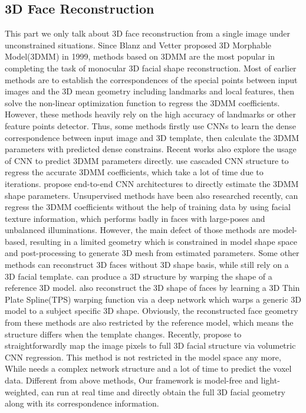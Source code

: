 \documentclass[runningheads]{llncs}
\begin{document}
\subsection{3D Face Reconstruction}
This part we only talk about 3D face reconstruction from a single image under unconstrained situations. 
Since Blanz and Vetter proposed 3D Morphable Model(3DMM) in 1999\cite{blanz1999a}, 
methods based on 3DMM are the most popular in completing the task of monocular 3D facial shape reconstruction.
Most of earlier methods are to establish the correspondences of the special points between input images and the 3D mean geometry including landmarks\cite{Lee2012Single,zhu2015high-fidelity,Thies2016Face2Face,Huber2016A,Cao2014Displaced,jeni2015dense,grewe2016fully} and local features\cite{Huber2015Fitting,Romdhani2005Estimating,grewe2016fully}, then solve the non-linear optimization function to regress the 3DMM coefficients. 
However, these methods heavily rely on the high accuracy of landmarks or other feature points detector.
Thus, some methods\cite{guler2017densereg,Yu2017Learning} firstly use CNNs to learn the dense correspondence between input image and 3D template, then calculate the 3DMM parameters with predicted dense constrains.
Recent works also explore the usage of CNN to predict 3DMM parameters directly. 
\cite{Jourabloo2016Large,zhu2016face,Richardson20163D,liu2016joint,Richardson2016Learning} use cascaded CNN structure to regress the accurate 3DMM coefficients, which take a lot of time due to iterations.
\cite{Dou2017End,Tran2016Regressing,jourabloo2015pose,laine2016facial} propose end-to-end CNN architectures to directly estimate the 3DMM shape parameters.
Unsupervised methods have been also researched recently, \cite{Tewari2017MoFA,Bas20173D} can regress the 3DMM coefficients without the help of training data by using facial texture information, which performs badly in faces with large-poses and unbalanced illuminations.
However, the main defect of those methods are model-based, resulting in a limited geometry which is constrained in model shape space and post-processing to generate 3D mesh from estimated parameters.
Some other methods can reconstruct 3D faces without 3D shape basis, while still rely on a 3D facial template.
\cite{Hassner2013Viewing,Kemelmacher20113D,gu20063d,Sela2017Unrestricted,santa20163d} can produce a 3D structure by warping the shape of a reference 3D model.
\cite{bhagavatula2017faster} also reconstruct the 3D shape of faces by learning a 3D Thin Plate Spline(TPS) warping function via a deep network which warps a generic 3D model to a subject specific 3D shape. 
Obviously, the reconstructed face geometry from these methods are also restricted by the reference model, which means the structure differs when the template changes.
Recently, \cite{Jackson2017Large} propose to straightforwardly map the image pixels to full 3D facial structure via volumetric CNN regression. This method is not restricted in the model space any more, While needs a complex network structure and a lot of time to predict the voxel data.
Different from above methods, Our framework is model-free and light-weighted, can run at real time and directly obtain the full 3D facial geometry along with its correspondence information. 
\end{document}

